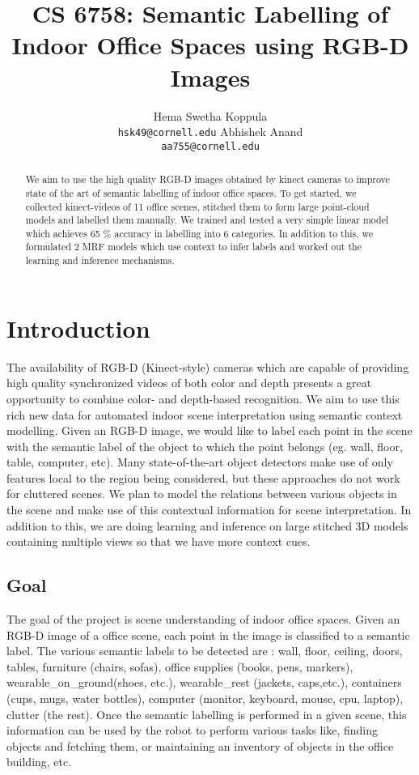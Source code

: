 \documentclass[11pt]{article} %
\title{CS 6758: Semantic Labelling of Indoor Office Spaces using RGB-D Images}
\author{
Hema Swetha Koppula \\
 \texttt{hsk49@cornell.edu}
 \And
Abhishek Anand\\
 \texttt{aa755@cornell.edu}
}
\begin{document}
\maketitle

\begin{abstract}
We aim to use the high quality RGB-D images obtained by kinect cameras to improve state of the art of semantic labelling of indoor office spaces.
To get started, we  collected kinect-videos of 11 office scenes, stitched them to form large point-cloud models and labelled them manually.
We trained and tested a very simple linear model which achieves 65 \% accuracy in labelling into 6 categories. In addition to this, we formulated 2 MRF models which use context to infer labels and worked out the learning and inference mechanisms. 
\end{abstract}

\section{Introduction}


  
  The availability of  RGB-D (Kinect-style) cameras \cite{kinect} which are capable of providing high quality synchronized 
  videos of both color and depth presents a great opportunity to combine color- and depth-based recognition. We aim 
  to use this rich new data for automated indoor scene interpretation using semantic context modelling. Given an RGB-D 
  image, we would like to label each point in the scene with the semantic label of the object to which the point belongs
  (eg. wall, floor, table, computer, etc). Many state-of-the-art object detectors make use of only features local to the region being 
  considered, but these approaches do not work for cluttered scenes. We plan to model the relations between various objects 
  in the scene and make use of this contextual information for scene interpretation. In addition to this, we are doing learning and
  inference on large stitched 3D models containing multiple views so that we have more context cues.

   \subsection{Goal}
     The goal of the project is scene understanding of indoor office spaces. Given an RGB-D image of a office scene, each point in the 
     image is classified to a semantic label. The various semantic labels to be detected are : wall, floor, ceiling, doors, tables, furniture 
     (chairs, sofas), office supplies (books, pens, markers), wearable\_on\_ground(shoes, etc.), wearable\_rest (jackets, caps,etc.), 
     containers (cups, mugs, water bottles), computer (monitor, keyboard, mouse, cpu, laptop), clutter (the rest). Once the semantic labelling 
     is performed in a given scene, this information can be used by the robot to perform various tasks like, finding objects and fetching them, 
     or maintaining an inventory of objects in the office building, etc.
\end{document}
